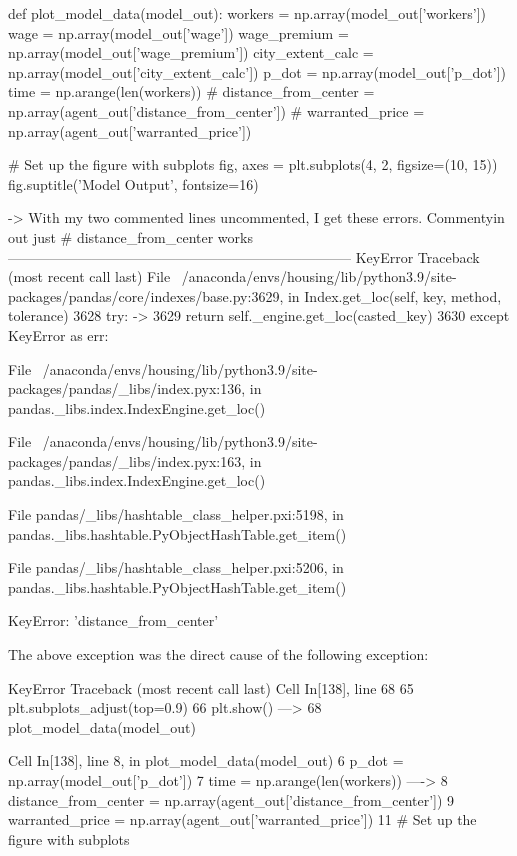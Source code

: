 def plot_model_data(model_out):
    workers = np.array(model_out['workers'])
    wage    = np.array(model_out['wage'])
    wage_premium    = np.array(model_out['wage_premium'])
    city_extent_calc = np.array(model_out['city_extent_calc'])
    p_dot   = np.array(model_out['p_dot'])
    time    = np.arange(len(workers))
   # distance_from_center = np.array(agent_out['distance_from_center'])
   # warranted_price = np.array(agent_out['warranted_price'])

    # Set up the figure with subplots
    fig, axes = plt.subplots(4, 2, figsize=(10, 15))
    fig.suptitle('Model Output', fontsize=16)




-> With my two commented lines uncommented, I get these errors. Commentyin out just # distance_from_center works 
    --------------------------------------------------------------------------
KeyError                                  Traceback (most recent call last)
File ~/anaconda/envs/housing/lib/python3.9/site-packages/pandas/core/indexes/base.py:3629, in Index.get_loc(self, key, method, tolerance)
   3628 try:
-> 3629     return self._engine.get_loc(casted_key)
   3630 except KeyError as err:

File ~/anaconda/envs/housing/lib/python3.9/site-packages/pandas/_libs/index.pyx:136, in pandas._libs.index.IndexEngine.get_loc()

File ~/anaconda/envs/housing/lib/python3.9/site-packages/pandas/_libs/index.pyx:163, in pandas._libs.index.IndexEngine.get_loc()

File pandas/_libs/hashtable_class_helper.pxi:5198, in pandas._libs.hashtable.PyObjectHashTable.get_item()

File pandas/_libs/hashtable_class_helper.pxi:5206, in pandas._libs.hashtable.PyObjectHashTable.get_item()

KeyError: 'distance_from_center'

The above exception was the direct cause of the following exception:

KeyError                                  Traceback (most recent call last)
Cell In[138], line 68
     65     plt.subplots_adjust(top=0.9)
     66     plt.show()
---> 68 plot_model_data(model_out)

Cell In[138], line 8, in plot_model_data(model_out)
      6 p_dot   = np.array(model_out['p_dot'])
      7 time    = np.arange(len(workers))
----> 8 distance_from_center = np.array(agent_out['distance_from_center'])
      9 warranted_price = np.array(agent_out['warranted_price'])
     11 # Set up the figure with subplots

